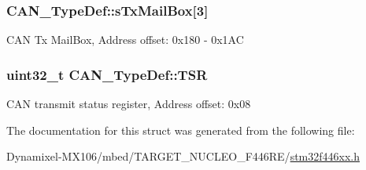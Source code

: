 \subsubsection[{\texorpdfstring{s\+Tx\+Mail\+Box}{sTxMailBox}}]{ C\+A\+N\+\_\+\+Type\+Def\+::s\+Tx\+Mail\+Box\mbox{[}3\mbox{]}}\hypertarget{struct_c_a_n___type_def_a328925e230f68a775f6f4ad1076c27ce}{}\label{struct_c_a_n___type_def_a328925e230f68a775f6f4ad1076c27ce}
C\+AN Tx Mail\+Box, Address offset\+: 0x180 -\/ 0x1\+AC 
\subsubsection[{\texorpdfstring{T\+SR}{TSR}}]{ uint32\+\_\+t C\+A\+N\+\_\+\+Type\+Def\+::\+T\+SR}\hypertarget{struct_c_a_n___type_def_acbc82ac4e87e75350fc586be5e56d95b}{}\label{struct_c_a_n___type_def_acbc82ac4e87e75350fc586be5e56d95b}
C\+AN transmit status register, Address offset\+: 0x08 

The documentation for this struct was generated from the following file\+:\begin{DoxyCompactItemize}
\item 
Dynamixel-\/\+M\+X106/mbed/\+T\+A\+R\+G\+E\+T\+\_\+\+N\+U\+C\+L\+E\+O\+\_\+\+F446\+R\+E/\hyperlink{stm32f446xx_8h}{stm32f446xx.\+h}\end{DoxyCompactItemize}
